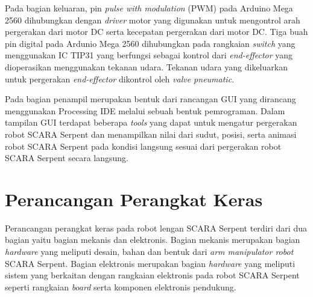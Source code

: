 Pada bagian keluaran, pin \textit{pulse with modulation} (PWM) pada Arduino Mega 2560 dihubungkan dengan \textit{driver} motor yang digunakan untuk mengontrol arah pergerakan dari motor DC serta kecepatan pergerakan dari motor DC. Tiga buah pin digital pada Ardunio Mega 2560 dihubungkan pada rangkaian \textit{switch} yang menggunakan IC TIP31 yang berfungsi sebagai kontrol dari \textit{end-effector} yang dioperasikan menggunakan tekanan udara. Tekanan udara yang dikeluarkan untuk pergerakan \textit{end-effector} dikontrol oleh \textit{valve pneumatic.}

Pada bagian penampil merupakan bentuk dari rancangan GUI yang dirancang menggunakan Processing IDE melalui sebuah bentuk pemrograman. Dalam tampilan GUI terdapat beberapa \textit{tools} yang dapat untuk mengatur pergerakan robot SCARA Serpent dan menampilkan nilai dari sudut, posisi, serta animasi robot SCARA Serpent pada kondisi langsung sesuai dari pergerakan robot SCARA Serpent secara langsung.
\section{ Perancangan Perangkat Keras }
Perancangan perangkat keras pada robot lengan SCARA Serpent terdiri dari dua bagian yaitu bagian mekanis dan elektronis. Bagian  mekanis merupakan bagian \textit{hardware} yang meliputi desain, bahan dan bentuk dari\textit{ arm manipulator robot} SCARA Serpent. Bagian elektronis merupakan bagian \textit{hardware} yang meliputi sistem yang berkaitan dengan rangkaian elektronis pada robot SCARA Serpent seperti rangkaian \textit{board} serta komponen elektronis pendukung.
